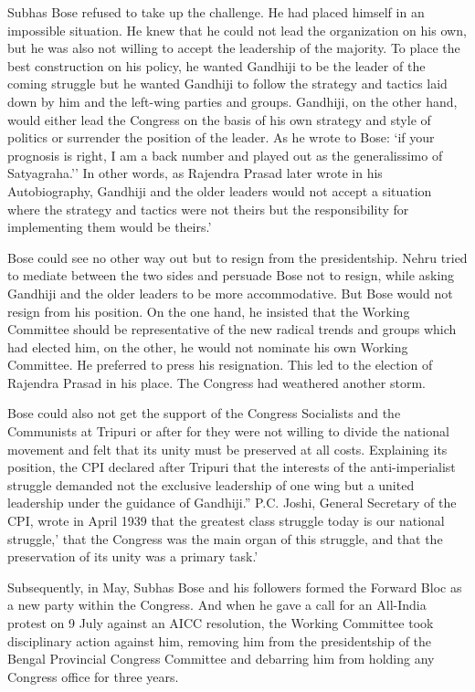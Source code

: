 \begin{multicols}{2}
Subhas Bose refused to take up the challenge. He had placed himself in an impossible situation. He knew that he could not lead the organization on his own, but he was also not willing to accept the leadership of the majority. To place the best construction on his policy, he wanted Gandhiji to be the leader of the coming struggle but he wanted Gandhiji to follow the strategy and tactics laid down by him and the left-wing parties and groups. Gandhiji, on the other hand, would either lead the Congress on the basis of his own strategy and style of politics or surrender the position of the leader. As he wrote to Bose: `if your prognosis is right, I am a back number and played out as the generalissimo of Satyagraha.'' In other words, as Rajendra Prasad later wrote in his Autobiography, Gandhiji and the older leaders would not accept a situation where the strategy and tactics were not theirs but the responsibility for implementing them would be theirs.' 

Bose could see no other way out but to resign from the presidentship. Nehru tried to mediate between the two sides and persuade Bose not to resign, while asking Gandhiji and the older leaders to be more accommodative. But Bose would not resign from his position. On the one hand, he insisted that the Working Committee should be representative of the new radical trends and groups which had elected him, on the other, he would not nominate his own Working Committee. He preferred to press his resignation. This led to the election of Rajendra Prasad in his place. The Congress had weathered another storm. 

Bose could also not get the support of the Congress Socialists and the Communists at Tripuri or after for they were not willing to divide the national movement and felt that its unity must be preserved at all costs. Explaining its position, the CPI declared after Tripuri that the interests of the anti-imperialist struggle demanded not the exclusive leadership of one wing but a united leadership under the guidance of Gandhiji.'' P.C. Joshi, General Secretary of the CPI, wrote in April 1939 that the greatest class struggle today is our national struggle,' that the Congress was the main organ of this struggle, and that the preservation of its unity was a primary task.' 

Subsequently, in May, Subhas Bose and his followers formed the Forward Bloc as a new party within the Congress. And when he gave a call for an All-India protest on 9 July against an AICC resolution, the Working Committee took disciplinary action against him, removing him from the presidentship of the Bengal Provincial Congress Committee and debarring him from holding any Congress office for three years. 


\end{multicols}

